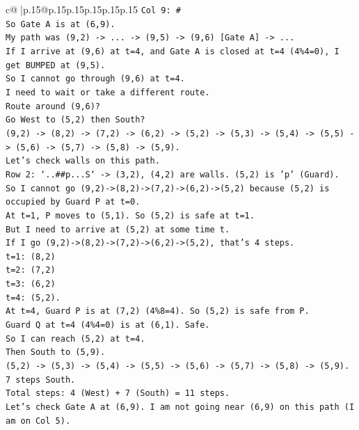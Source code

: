 \documentclass{article}
\begin{document}
{\begin{supertabular}{c@{$\;$}|p{.15\linewidth}@{}p{.15\linewidth}p{.15\linewidth}p{.15\linewidth}p{.15\linewidth}p{.15\linewidth}}
{{{\texttt{Col 9: \#} \\
\texttt{So Gate A is at (6,9).} \\
\texttt{My path was (9,2) {-}> ... {-}> (9,5) {-}> (9,6) {[}Gate A{]} {-}> ...} \\
\texttt{If I arrive at (9,6) at t=4, and Gate A is closed at t=4 (4\%4=0), I get BUMPED at (9,5).} \\
\texttt{So I cannot go through (9,6) at t=4.} \\
\texttt{I need to wait or take a different route.} \\
\texttt{Route around (9,6)?} \\
\texttt{Go West to (5,2) then South?} \\
\texttt{(9,2) {-}> (8,2) {-}> (7,2) {-}> (6,2) {-}> (5,2) {-}> (5,3) {-}> (5,4) {-}> (5,5) {-}> (5,6) {-}> (5,7) {-}> (5,8) {-}> (5,9).} \\
\texttt{Let's check walls on this path.} \\
\texttt{Row 2: `..\#\#p...S` {-}> (3,2), (4,2) are walls. (5,2) is 'p' (Guard).} \\
\texttt{So I cannot go (9,2){-}>(8,2){-}>(7,2){-}>(6,2){-}>(5,2) because (5,2) is occupied by Guard P at t=0.} \\
\texttt{At t=1, P moves to (5,1). So (5,2) is safe at t=1.} \\
\texttt{But I need to arrive at (5,2) at some time t.} \\
\texttt{If I go (9,2){-}>(8,2){-}>(7,2){-}>(6,2){-}>(5,2), that's 4 steps.} \\
\texttt{t=1: (8,2)} \\
\texttt{t=2: (7,2)} \\
\texttt{t=3: (6,2)} \\
\texttt{t=4: (5,2).} \\
\texttt{At t=4, Guard P is at (7,2) (4\%8=4). So (5,2) is safe from P.} \\
\texttt{Guard Q at t=4 (4\%4=0) is at (6,1). Safe.} \\
\texttt{So I can reach (5,2) at t=4.} \\
\texttt{Then South to (5,9).} \\
\texttt{(5,2) {-}> (5,3) {-}> (5,4) {-}> (5,5) {-}> (5,6) {-}> (5,7) {-}> (5,8) {-}> (5,9).} \\
\texttt{7 steps South.} \\
\texttt{Total steps: 4 (West) + 7 (South) = 11 steps.} \\
\texttt{Let's check Gate A at (6,9). I am not going near (6,9) on this path (I am on Col 5).} \\
}}}
\end{supertabular}}
\end{document}
